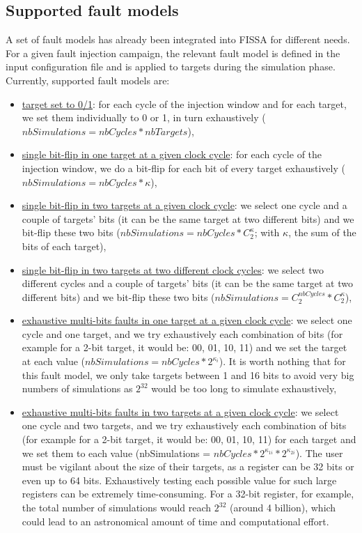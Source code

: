 \subsection{Supported fault models}
\label{subsec:supported_fault_models}

A set of fault models has already been integrated into FISSA for different needs. For a given fault injection campaign, the relevant fault model is defined in the input configuration file and is applied to targets during the simulation phase.
Currently, supported fault models are:
\begin{itemize}
    \justifying
    \item \underline{target set to 0/1}: for each cycle of the injection window and for each target, we set them individually to 0 or 1, in turn exhaustively ($nbSimulations = nbCycles * nbTargets$),
    \item \underline{single bit-flip in one target at a given clock cycle}: for each cycle of the injection window, we do a bit-flip for each bit of every target exhaustively ($nbSimulations = nbCycles * \kappa$),
    \item \underline{single bit-flip in two targets at a given clock cycle}: we select one cycle and a couple of targets' bits (it can be the same target at two different bits) and we bit-flip these two bits ($nbSimulations = nbCycles * C_{2}^\kappa$; with $\kappa$, the sum of the bits of each target),
    \item \underline{single bit-flip in two targets at two different clock cycles}:  we select two different cycles and a couple of targets' bits (it can be the same target at two different bits) and we bit-flip these two bits ($nbSimulations = C_{2}^{nbCycles} * C_{2}^\kappa$),
    \item \underline{exhaustive multi-bits faults in one target at a given clock cycle}: we select one cycle and one target, and we try exhaustively each combination of bits (for example for a 2-bit target, it would be: 00, 01, 10, 11) and we set the target at each value ($nbSimulations = nbCycles * 2^{\kappa_i}$). It is worth nothing that for this fault model, we only take targets between 1 and 16 bits to avoid very big numbers of simulations as $2^{32}$ would be too long to simulate exhaustively,
    \item \underline{exhaustive multi-bits faults in two targets at a given clock cycle}: we select one cycle and two targets, and we try exhaustively each combination of bits (for example for a 2-bit target, it would be: 00, 01, 10, 11) for each target and we set them to each value (nbSimulations = $nbCycles * 2^{\kappa_{1i}}* 2^{\kappa_{2i}}$). The user must be vigilant about the size of their targets, as a register can be 32 bits or even up to 64 bits. Exhaustively testing each possible value for such large registers can be extremely time-consuming. For a 32-bit register, for example, the total number of simulations would reach $2^{32}$ (around 4 billion), which could lead to an astronomical amount of time and computational effort.
\end{itemize}

